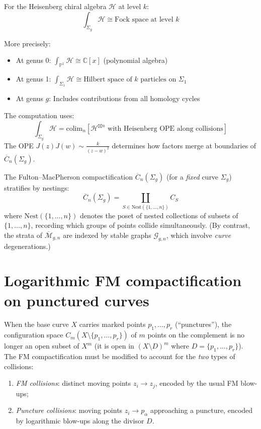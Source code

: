\begin{example}\label{ex:fact-heisenberg}
For the Heisenberg chiral algebra $\mathcal{H}$ at level $k$:
\[\int_{\Sigma_g} \mathcal{H} \cong \text{Fock space at level } k\]

More precisely:
\begin{itemize}
\item At genus 0: $\int_{\mathbb{P}^1} \mathcal{H} \cong \mathbb{C}[x]$ (polynomial algebra)
\item At genus 1: $\int_{\Sigma_1} \mathcal{H} \cong \text{Hilbert space of } k \text{ particles on } \Sigma_1$
\item At genus $g$: Includes contributions from all homology cycles
\end{itemize}

The computation uses:
\[\int_{\Sigma_g} \mathcal{H} = \text{colim}_n \left[\mathcal{H}^{\boxtimes n} \text{ with Heisenberg OPE along collisions}\right]\]
The OPE $J(z)J(w) \sim \frac{k}{(z-w)^2}$ determines how factors merge at boundaries of $\overline{C}_n(\Sigma_g)$.
\end{example}

The Fulton--MacPherson compactification $\overline{C}_n(\Sigma_g)$ (for a \emph{fixed} curve $\Sigma_g$) stratifies by nestings:
\[\overline{C}_n(\Sigma_g) = \coprod_{S \in \mathrm{Nest}(\{1,\ldots,n\})} C_S\]
where $\mathrm{Nest}(\{1,\ldots,n\})$ denotes the poset of nested collections of subsets of $\{1,\ldots,n\}$, recording which groups of points collide simultaneously. (By contrast, the strata of $\overline{\mathcal{M}}_{g,n}$ are indexed by stable graphs $\mathcal{G}_{g,n}$, which involve \emph{curve} degenerations.)

\section{Logarithmic FM compactification on punctured curves}
\label{sec:log-fm-punctured}

When the base curve $X$ carries marked points $p_1, \ldots, p_r$
(``punctures''), the configuration space $C_m(X \setminus \{p_1,
\ldots, p_r\})$ of $m$ points on the complement is no longer an
open subset of $X^m$ (it is open in $(X \setminus D)^m$ where
$D = \{p_1, \ldots, p_r\}$).  The FM compactification must be
modified to account for the \emph{two} types of collisions:
\begin{enumerate}[label=(\roman*)]
\item \emph{FM collisions}: distinct moving points
  $z_i \to z_j$, encoded by the usual FM blow-ups;
\item \emph{Puncture collisions}: moving points $z_i \to p_\alpha$
  approaching a puncture, encoded by logarithmic blow-ups along
  the divisor $D$.
\end{enumerate}

